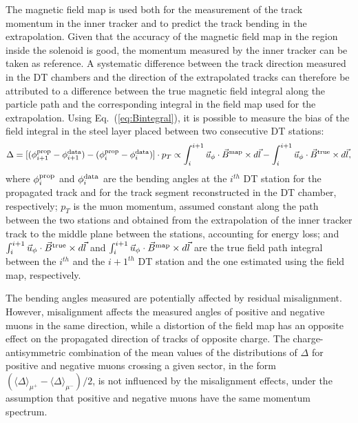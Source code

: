 The magnetic field map is used both for the measurement of the track
momentum in the inner tracker and to predict the track bending in the
extrapolation.
Given that the accuracy of the magnetic field map in the
region inside the solenoid is good, the momentum measured by the inner
tracker can be taken as reference.
A systematic difference between
the track direction measured in the DT chambers and the direction of
the extrapolated tracks can therefore be attributed to a difference
between the true magnetic field integral along the particle
path and the corresponding integral in the field map used for the
extrapolation.
Using Eq.~(\ref{eq:Bintegral}), it is possible to measure the
bias of the field integral in the steel layer placed between
two consecutive DT stations:
\begin{equation}
\Delta=[(\phi^{\rm prop}_{i+1}-\phi^{\rm data}_{i+1}) -
(\phi^{\rm prop}_{i}-\phi^{\rm data}_{i})]\cdot p_{T}%
\propto
\int^{i+1}_{i} \vec{u}_{\phi}\cdot\vec{B}^{\rm map}\times d\vec{l}
 - \int^{i+1}_{i}
 \vec{u}_{\phi}\cdot\vec{B}^{\rm true}\times d\vec{l},
\label{eq:delta}
\end{equation}
where $\phi^{\rm prop}_{i}$ and $\phi^{\rm data}_{i}$ are the bending angles at
the $i^{th}$ DT station for the propagated track and
for the track segment reconstructed in the DT chamber, respectively;
$p_{T}$ %
is the muon
momentum, assumed constant along the path between the two stations and
obtained from the extrapolation of the inner tracker track to the
middle plane between the stations, accounting for energy loss;
and
$\int^{i+1}_{i} \vec{u}_{\phi}\cdot\vec{B}^{\rm true}\times d\vec{l}$ and
$\int^{i+1}_{i} \vec{u}_{\phi}\cdot\vec{B}^{\rm map}\times d\vec{l}$
are the true field path integral between the $i^{th}$ and the
$i+1^{th}$ DT station and the one estimated using the field map,
respectively.


The bending angles measured are potentially affected by residual
misalignment.  However, misalignment affects the measured angles of
positive and negative muons in the same direction, while a distortion of the
field map has an opposite effect on the propagated direction of tracks of
opposite charge.  The charge-antisymmetric
combination of the mean values of the distributions of $\Delta$ for
positive and negative muons crossing a given sector, in the form
$(\langle\Delta\rangle_{\mu^+}-\langle\Delta\rangle_{\mu^-})/2$,
is not influenced by the misalignment effects, under the
assumption that positive and negative muons have the same momentum spectrum.

